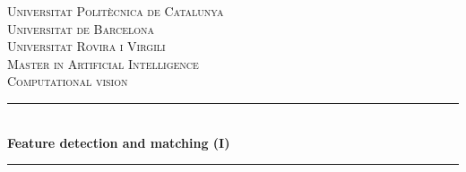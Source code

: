 \begin{titlepage}

\vspace*{\fill}

\newcommand{\HRule}{\rule{\linewidth}{0.5mm}} %

\center %
 

\textsc{\LARGE Universitat Politècnica de Catalunya}\\[0.5cm] %
\textsc{\LARGE Universitat de Barcelona}\\[0.5cm] %
\textsc{\LARGE Universitat Rovira i Virgili}\\[1.5cm] %
\textsc{\Large Master in Artificial Intelligence}\\[0.5cm] %
\textsc{\large Computational vision}\\[0.5cm] %


\HRule \\[0.4cm]
{ \huge \bfseries Feature detection and matching (I)}\\[0.4cm] %
\HRule \\[1.5cm]
 



\end{titlepage}
